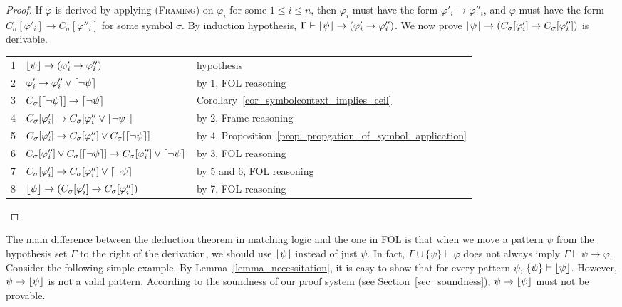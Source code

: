 \documentclass[acmsmall]{acmart}
\theoremstyle{acmdefinition}
\newcommand{\imp}{\to}
\newcommand{\CSub}[1]{C_{#1}}
\newcommand{\Csigmaapp}[1]{\CSub{\sigma}[#1]}
\newcommand{\prule}[1]{\textsc{(#1)}}
\newcommand{\framing}{\prule{Framing}\xspace}
\newcommand{\eframing}{Frame reasoning\xspace}
\DeclarePairedDelimiter{\ceil}{\lceil}{\rceil}
\DeclarePairedDelimiter{\floor}{\lfloor}{\rfloor}
\begin{document}
\begin{proof}
If $\varphi$ is derived by applying \framing on $\varphi_i$ for some
$1 \le i \le n$,
then $\varphi_i$ must have the form $\varphi'_i \imp \varphi''_i$,
and $\varphi$ must have the form 
$\Csigmaapp{\varphi'_i} \imp \Csigmaapp{\varphi''_i}$ for some symbol $\sigma$.
By induction hypothesis,
$\Gamma \vdash \floor{\psi} \imp (\varphi'_i \imp \varphi''_i)$.
We now prove 
$\floor{\psi} \imp (\Csigmaapp{\varphi'_i} \imp 
\Csigmaapp{\varphi''_i})$
is derivable.
\begin{center}
\begin{tabular}{l|ll}
1 & $\floor{\psi} \imp (\varphi'_i \imp \varphi''_i)$
  & hypothesis \\
2 & ${\varphi'_i}
     \imp {\varphi''_i} \vee \ceil{\neg \psi}$
  & by 1, FOL reasoning \\
3 & $\Csigmaapp{\ceil{\neg \psi}}
      \imp \ceil{\neg \psi}$
  & Corollary~\ref{cor_symbolcontext_implies_ceil} \\
4 & $\Csigmaapp{\varphi'_i}
      \imp \Csigmaapp{\varphi''_i \vee \ceil{\neg \psi}}$ 
  & by 2, \eframing \\
5 & $\Csigmaapp{\varphi'_i}
      \imp \Csigmaapp{\varphi''_i} \vee \Csigmaapp{\ceil{\neg \psi}}$ 
  & by 4, Proposition~\ref{prop_propgation_of_symbol_application} \\
6 & $\Csigmaapp{\varphi''_i} \vee \Csigmaapp{\ceil{\neg \psi}}
     \imp \Csigmaapp{\varphi''_i} \vee \ceil{\neg \psi} $
  & by 3, FOL reasoning \\
7 & $\Csigmaapp{\varphi'_i}
     \imp \Csigmaapp{\varphi''_i} \vee \ceil{\neg \psi} $ 
  & by 5 and 6, FOL reasoning \\
8 & $\floor{\psi} 
     \imp (\Csigmaapp{\varphi'_i} \imp \Csigmaapp{\varphi''_i})$ 
  & by 7, FOL reasoning \\
\end{tabular}
\end{center}
\end{proof}

The main difference between the deduction theorem in matching logic
and the one in FOL is that when we move a pattern $\psi$ from
the hypothesis set $\Gamma$ to the right of the derivation,
we should use $\floor{\psi}$ instead of just $\psi$.
In fact, $\Gamma \cup \{ \psi \} \vdash \varphi$ does not always
imply $\Gamma \vdash \psi \imp \varphi$.
Consider the following simple example.
By Lemma~\ref{lemma_necessitation},
it is easy to show that for every pattern $\psi$,
$\{ \psi \} \vdash \floor{\psi}$.
However, $\psi \imp \floor{\psi}$ is not a valid pattern.
According to the soundness of our proof system
(see Section~\ref{sec_soundness}),
$\psi \imp \floor{\psi}$ must not be provable.
\end{document}
